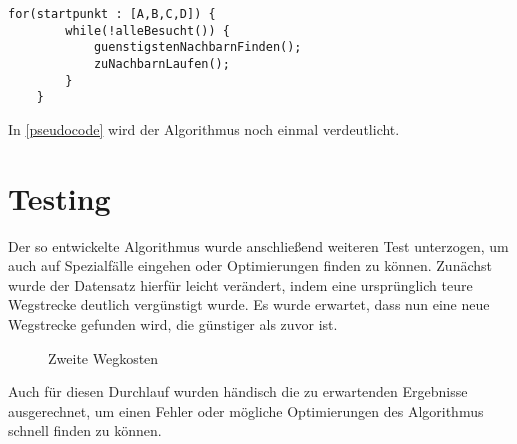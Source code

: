 \begin{minipage}{\textwidth}
	\vspace{-10px}
	\begin{lstlisting}[style=VHDL,label=pseudocode,caption=Algorithmus Pseudocode, gobble=4]
	for(startpunkt : [A,B,C,D]) {
		while(!alleBesucht()) {
			guenstigstenNachbarnFinden();
			zuNachbarnLaufen();
		}
	}
	\end{lstlisting}
\end{minipage}

In \cref{pseudocode} wird der Algorithmus noch einmal verdeutlicht.


\section{Testing}
\label{sec:testing}
Der so entwickelte Algorithmus wurde anschließend weiteren Test unterzogen, um auch auf Spezialfälle eingehen oder Optimierungen finden zu können. Zunächst wurde der Datensatz hierfür leicht verändert, indem eine ursprünglich teure Wegstrecke deutlich vergünstigt wurde. Es wurde erwartet, dass nun eine neue Wegstrecke gefunden wird, die günstiger als zuvor ist.

\begin{figure}[H]
	\centering
	\caption{Zweite Wegkosten
		\label{fig:zweite-wegkosten}}
\end{figure}

Auch für diesen Durchlauf wurden händisch die zu erwartenden Ergebnisse ausgerechnet, um einen Fehler oder mögliche Optimierungen des Algorithmus schnell finden zu können.

